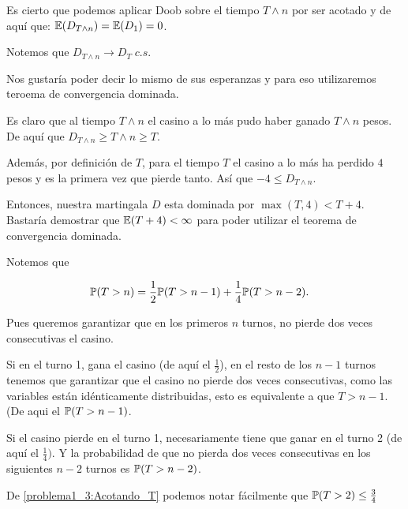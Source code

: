 	Es cierto que podemos aplicar Doob sobre el tiempo $T \wedge n$ por ser acotado y de aquí que:
	$\mathbb{E}(D_{T \wedge n}) = \mathbb{E}(D_1) = 0$.\par\null
	
	Notemos que $D_{T \wedge n} \longrightarrow D_T \; c.s.$\par\null
	
	Nos gustaría poder decir lo mismo de sus esperanzas y para eso utilizaremos teroema de convergencia dominada.\par\null
	
	Es claro que al tiempo $T \wedge n$ el casino a lo más pudo haber ganado $T \wedge n$ pesos.
	De aquí que $D_{T \wedge n} \geq T \wedge n \geq T$.\par\null
	
	Además, por definición de $T$, para el tiempo $T$ el casino a lo más ha perdido $4$ pesos y es la primera vez que 
	pierde tanto. Así que $-4 \leq D_{T \wedge n}$.\par\null 
	
	Entonces, nuestra martingala $D$ esta dominada por $\max(T, 4) < T + 4$. Bastaría demostrar que $\mathbb{E}(T+4) < \infty$ para poder
	utilizar el teorema de convergencia dominada.\par\null
	
	Notemos que 
    
	\begin{align}\label{problema1_3:Acotando_T}
		\mathbb{P}(T > n) &= \frac{1}{2} \mathbb{P}(T > n-1) + \frac{1}{4} \mathbb{P}(T > n-2). 
	\end{align}\par\null
	
	Pues queremos garantizar que en los primeros $n$ turnos, no pierde dos veces consecutivas el casino.\par\null
	
	Si en el turno 1, gana el casino (de aquí el $\frac{1}{2}$), en el resto de los $n-1$ turnos tenemos que garantizar que 
	el casino no pierde dos veces consecutivas, como las variables están idénticamente distribuidas, esto es equivalente a que
	$T>n-1$. (De aqui el $\mathbb{P}(T > n-1)$.\par\null
	
	Si el casino pierde en el turno 1, necesariamente tiene que ganar en el turno 2 (de aquí el $\frac{1}{4})$. Y la probabilidad
	de que no pierda dos veces consecutivas en los siguientes $n-2$ turnos es $\mathbb{P}(T > n-2)$.\par\null		    
	
	De \eqref{problema1_3:Acotando_T} podemos notar fácilmente que $\mathbb{P}(T > 2) \leq \frac{3}{4}$\par\null
	
